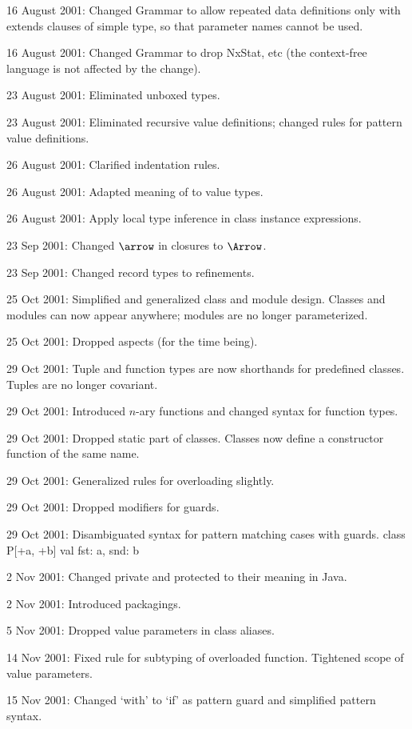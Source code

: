 \documentclass[11pt]{report}
\begin{document}
{16 August 2001: Changed Grammar to allow repeated data definitions
only with extends clauses of simple type, so that parameter names
cannot be used.

16 August 2001: Changed Grammar to drop NxStat, etc (the context-free language
is not affected by the change).

23 August 2001: Eliminated unboxed types.

23 August 2001: Eliminated recursive value definitions; changed rules
                for pattern value definitions.

26 August 2001: Clarified indentation rules.

26 August 2001: Adapted meaning of \verb@null@ to value types.

26 August 2001: Apply local type inference in class instance expressions.

23 Sep 2001: Changed $\arrow$ in closures to $\Arrow$.

23 Sep 2001: Changed record types to refinements.

25 Oct 2001: Simplified and generalized class and module
design. Classes and modules can now appear anywhere; modules are no
longer parameterized.

25 Oct 2001: Dropped aspects (for the time being).

29 Oct 2001:
  Tuple and function types are now shorthands for predefined
  classes. Tuples are no longer covariant.

29 Oct 2001:
  Introduced $n$-ary functions and changed syntax for function types.

29 Oct 2001:
  Dropped static part of classes. Classes now define a constructor
  function of the same name.

29 Oct 2001:
  Generalized rules for overloading slightly.

29 Oct 2001:
  Dropped modifiers for guards.

29 Oct 2001:
  Disambiguated syntax for pattern matching cases with guards.
class P[+a, +b] { 
  val fst: a, snd: b 
}

2 Nov 2001: Changed private and protected to their meaning in Java.

2 Nov 2001: Introduced packagings.

5 Nov 2001: Dropped value parameters in class aliases.

14 Nov 2001: Fixed rule for subtyping of overloaded
function. Tightened scope of value parameters.

15 Nov 2001: Changed `with' to `if' as pattern guard and simplified
pattern syntax.

}
\end{document}
